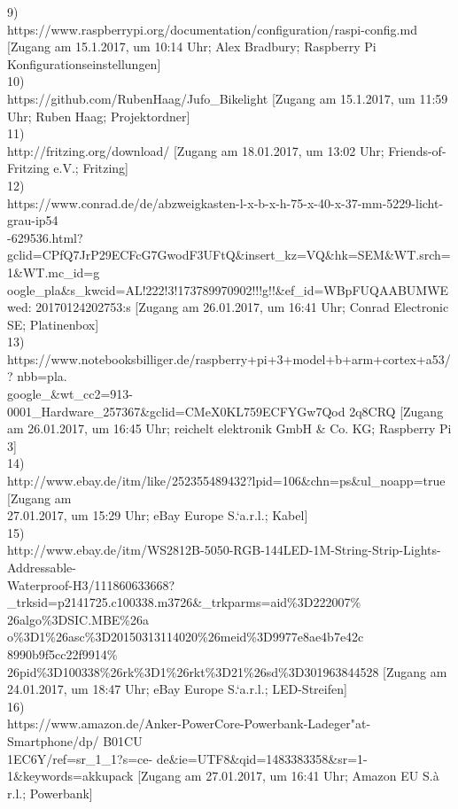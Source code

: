 \documentclass [a4paper, 11pt] {article}
\begin{document}
9)\\
https://www.raspberrypi.org/documentation/configuration/raspi-config.md [Zugang am 15.1.2017, um 10:14 Uhr; Alex Bradbury; Raspberry Pi Konfigurationseinstellungen]\\
10)\\
https://github.com/RubenHaag/Jufo\_Bikelight [Zugang am 15.1.2017, um 11:59 Uhr; Ruben Haag; Projektordner]\\
11)\\
http://fritzing.org/download/ [Zugang am 18.01.2017, um 13:02 Uhr; Friends-of-Fritzing e.V.; Fritzing]\\
12)\\
https://www.conrad.de/de/abzweigkasten-l-x-b-x-h-75-x-40-x-37-mm-5229-licht-grau-ip54\\-629536.html? gclid=CPfQ7JrP29ECFcG7GwodF3UFtQ\&insert\_kz=VQ\&hk=SEM\&WT.srch=\\1\&WT.mc\_id=g oogle\_pla\&s\_kwcid=AL!222!3!173789970902!!!g!!\&ef\_id=WBpFUQAABUMWE\\wed: 20170124202753:s [Zugang am 26.01.2017, um 16:41 Uhr; Conrad Electronic SE; Platinenbox]\\
13)\\
https://www.notebooksbilliger.de/raspberry+pi+3+model+b+arm+cortex+a53/? nbb=pla.\\google\_\&wt\_cc2=913-0001\_Hardware\_257367\&gclid=CMeX0KL759ECFYGw7Qod 2q8CRQ [Zugang am 26.01.2017, um 16:45 Uhr; reichelt elektronik GmbH \& Co. KG; Raspberry Pi 3]\\
14)\\
http://www.ebay.de/itm/like/252355489432?lpid=106\&chn=ps\&ul\_noapp=true [Zugang am\\ 27.01.2017, um 15:29 Uhr; eBay Europe S.`a.r.l.; Kabel]\\
15)\\
http://www.ebay.de/itm/WS2812B-5050-RGB-144LED-1M-String-Strip-Lights-Addressable-\\ Waterproof-H3/111860633668? \_trksid=p2141725.c100338.m3726\&\_trkparms=aid\%3D222007\%\\26algo\%3DSIC.MBE\%26a o\%3D1\%26asc\%3D20150313114020\%26meid\%3D9977e8ae4b7e42c\\8990b9f5cc22f9914\% 26pid\%3D100338\%26rk\%3D1\%26rkt\%3D21\%26sd\%3D301963844528 [Zugang am 24.01.2017, um 18:47 Uhr; eBay Europe S.`a.r.l.; LED-Streifen]\\
16)\\
https://www.amazon.de/Anker-PowerCore-Powerbank-Ladeger"at-Smartphone/dp/ B01CU\\1EC6Y/ref=sr\_1\_1?s=ce- de\&ie=UTF8\&qid=1483383358\&sr=1-1\&keywords=akkupack [Zugang am 27.01.2017, um 16:41 Uhr; Amazon EU S.\`a r.l.; Powerbank]\\
\end{document}
